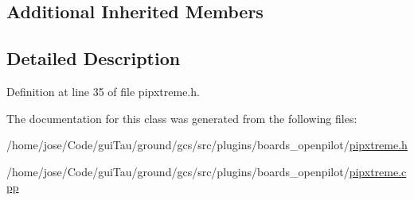 \subsection*{Additional Inherited Members}


\subsection{Detailed Description}


Definition at line 35 of file pipxtreme.\-h.



The documentation for this class was generated from the following files\-:\begin{DoxyCompactItemize}
\item 
/home/jose/\-Code/gui\-Tau/ground/gcs/src/plugins/boards\-\_\-openpilot/\hyperlink{pipxtreme_8h}{pipxtreme.\-h}\item 
/home/jose/\-Code/gui\-Tau/ground/gcs/src/plugins/boards\-\_\-openpilot/\hyperlink{pipxtreme_8cpp}{pipxtreme.\-cpp}\end{DoxyCompactItemize}

